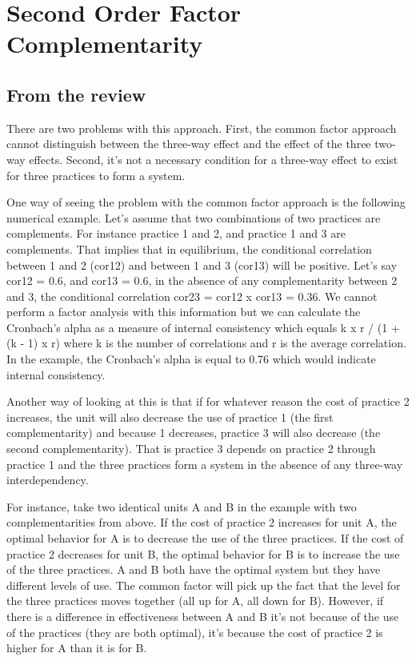 \documentclass[]{article} %
\begin{document}
\section{Second Order Factor Complementarity}
\subsection{From the review}

There are two problems with this approach. First, the common factor
approach cannot distinguish between the three-way effect and the
effect of the three two-way effects. Second, it's not a necessary
condition for a three-way effect to exist for three practices to form
a system.

One way of seeing the problem with the common factor approach is the
following numerical example. Let's assume that two combinations of two
practices are complements. For instance practice 1 and 2, and practice
1 and 3 are complements. That implies that in equilibrium, the
conditional correlation between 1 and 2 (cor12) and between 1 and 3
(cor13) will be positive. Let's say cor12 = 0.6, and cor13 = 0.6, in
the absence of any complementarity between 2 and 3, the conditional
correlation cor23 = cor12 x cor13 = 0.36. We cannot perform a factor
analysis with this information but we can calculate the Cronbach's
alpha as a measure of internal consistency which equals k x r / (1 +
(k - 1) x r) where k is the number of correlations and r is the
average correlation. In the example, the Cronbach's alpha is equal to
0.76 which would indicate internal consistency. 

Another way of looking at this is that if for whatever reason the cost
of practice 2 increases, the unit will also decrease the use of
practice 1 (the first complementarity) and because 1 decreases,
practice 3 will also decrease (the second complementarity). That is
practice 3 depends on practice 2 through practice 1 and the three
practices form a system in the absence of any three-way
interdependency.

For instance, take two identical units A and B in the example with two
complementarities from above. If the cost of practice 2 increases for
unit A, the optimal behavior for A is to decrease the use of the three
practices. If the cost of practice 2 decreases for unit B, the optimal
behavior for B is to increase the use of the three practices. A and B
both have the optimal system but they have different levels of
use. The common factor will pick up the fact that the level for the
three practices moves together (all up for A, all down for B). 
However, if there is a difference in effectiveness between A and B
it's not because of the use of the practices (they are both optimal), 
it's because the cost of practice 2 is higher for A than it is for B. 
\end{document}
